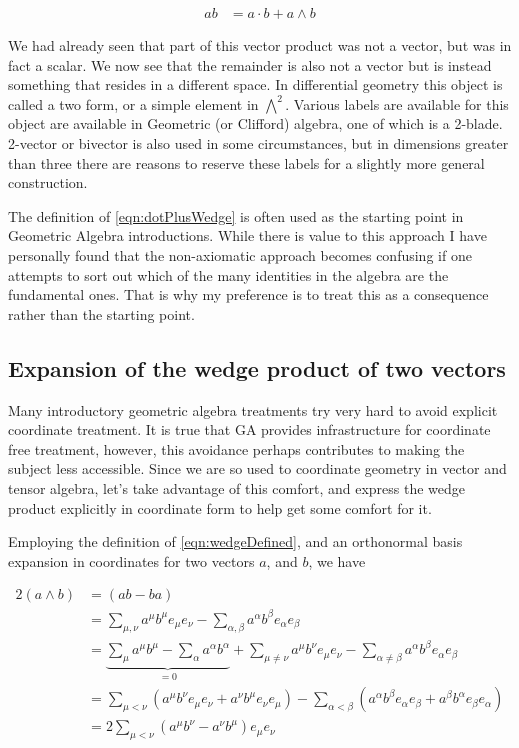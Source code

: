 \documentclass{article}
\begin{document}
\begin{align}\label{eqn:dotPlusWedge}
a b %
&= a \cdot b + a \wedge b
\end{align}

We had already seen that part of this vector product was not a vector, but was in fact a scalar.  We now see that the remainder is also not a vector but is instead something that resides in a different space.  In differential geometry this object is called a two form, or a simple element in $\bigwedge^2$.  Various labels are available for this object are available in Geometric (or Clifford) algebra, one of which is a 2-blade.  2-vector or bivector is also used in some circumstances, but in dimensions greater than three there are reasons to reserve these labels for a slightly more general construction.

The definition of \ref{eqn:dotPlusWedge} is often used as the starting point in Geometric Algebra introductions.  While there is value to this approach I have personally found that the non-axiomatic approach becomes confusing if one attempts to sort out which of the many identities in the algebra are the fundamental ones.  That is why my preference is to treat this as a consequence rather than the starting point.

\subsection{ Expansion of the wedge product of two vectors }

Many introductory geometric algebra treatments try very hard to avoid explicit coordinate treatment.  It is true that GA provides infrastructure for coordinate free treatment, however, this avoidance perhaps contributes to making the subject less accessible.  Since we are so used to coordinate geometry in vector and tensor algebra, let's take advantage of this comfort, and express the wedge product explicitly in coordinate form to help get some comfort for it.

Employing the definition of \ref{eqn:wedgeDefined}, and an orthonormal basis
expansion in 
coordinates for two vectors $a$, and $b$, we have

\begin{align*}
2 (a \wedge b)
&= ( a b - b a ) \\
&= 
\sum_{\mu,\nu} a^\mu b^\mu e_\mu e_\nu 
-\sum_{\alpha,\beta} a^\alpha b^\beta e_\alpha e_\beta \\
&= 
\underbrace{\sum_{\mu} a^\mu b^\mu 
- \sum_{\alpha} a^\alpha b^\alpha }_{=0}
+ \sum_{\mu \ne \nu} a^\mu b^\nu e_\mu e_\nu 
- \sum_{\alpha \ne \beta} a^\alpha b^\beta e_\alpha e_\beta \\
&=
\sum_{\mu < \nu} (a^\mu b^\nu e_\mu e_\nu + a^\nu b^\mu e_\nu e_\mu)
- \sum_{\alpha < \beta} (a^\alpha b^\beta e_\alpha e_\beta + a^\beta b^\alpha e_\beta e_\alpha )
\\
&=
2 \sum_{\mu < \nu} ( a^\mu b^\nu - a^\nu b^\mu ) e_\mu e_\nu 
\end{align*}
\end{document}
